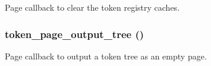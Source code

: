 \label{token_8pages_8inc_ad77cea030ce3c4aa50e43d5b93d91908}
Page callback to clear the token registry caches. \hypertarget{token_8pages_8inc_ac61826267ce539194039a1e0d1b1c85d}{
\subsubsection[{token\_\-page\_\-output\_\-tree}]{\setlength{\rightskip}{0pt plus 5cm}token\_\-page\_\-output\_\-tree ()}}
\label{token_8pages_8inc_ac61826267ce539194039a1e0d1b1c85d}
Page callback to output a token tree as an empty page. 